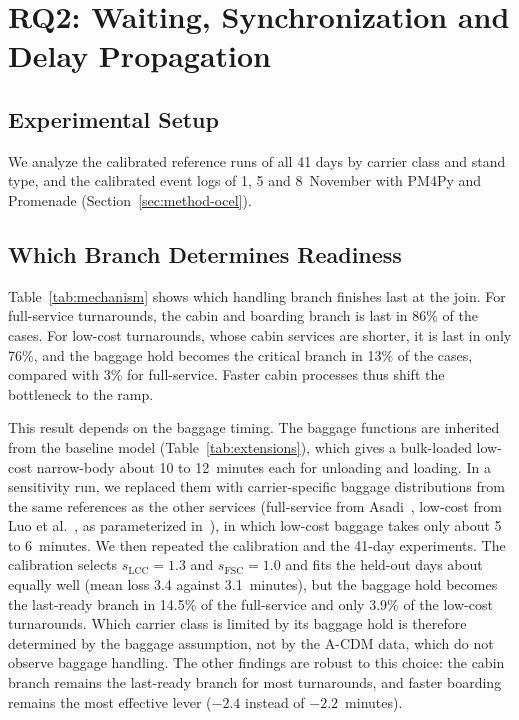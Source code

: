 \section{RQ2: Waiting, Synchronization and Delay Propagation}
\label{sec:eval-promenade}

\subsection{Experimental Setup}
We analyze the calibrated reference runs of all 41 days by carrier class and stand type, and the calibrated event logs of 1, 5 and 8~November with PM4Py and Promenade (Section~\ref{sec:method-ocel}).

\subsection{Which Branch Determines Readiness}
Table~\ref{tab:mechanism} shows which handling branch finishes last at the join. For full-service turnarounds, the cabin and boarding branch is last in 86\% of the cases. For low-cost turnarounds, whose cabin services are shorter, it is last in only 76\%, and the baggage hold becomes the critical branch in 13\% of the cases, compared with 3\% for full-service. Faster cabin processes thus shift the bottleneck to the ramp.

This result depends on the baggage timing. The baggage functions are inherited from the baseline model (Table~\ref{tab:extensions}), which gives a bulk-loaded low-cost narrow-body about 10 to 12~minutes each for unloading and loading. In a sensitivity run, we replaced them with carrier-specific baggage distributions from the same references as the other services (full-service from Asadi~\cite{asadi2024robust}, low-cost from Luo et al.~\cite{luo2024digitaltwin}, as parameterized in~\cite{tkacenko2026}), in which low-cost baggage takes only about 5 to 6~minutes. We then repeated the calibration and the 41-day experiments. The calibration selects $s_{\mathrm{LCC}}=1.3$ and $s_{\mathrm{FSC}}=1.0$ and fits the held-out days about equally well (mean loss 3.4 against 3.1~minutes), but the baggage hold becomes the last-ready branch in 14.5\% of the full-service and only 3.9\% of the low-cost turnarounds. Which carrier class is limited by its baggage hold is therefore determined by the baggage assumption, not by the A-CDM data, which do not observe baggage handling. The other findings are robust to this choice: the cabin branch remains the last-ready branch for most turnarounds, and faster boarding remains the most effective lever ($-2.4$ instead of $-2.2$~minutes).

